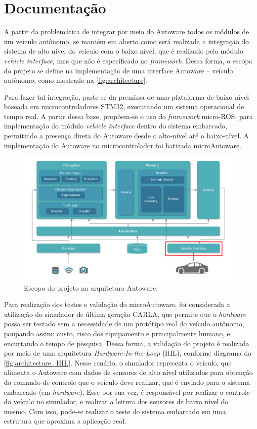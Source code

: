 \clearpage

\section{Documentação}

A partir da problemática de integrar por meio do Autoware todos os módulos de um veículo autônomo, se mantém em aberto como será realizada a integração do sistema de alto nível do veículo com o baixo nível, que é realizado pelo módulo \textit{vehicle interface}, mas que não é especificado no \textit{framework}. Dessa forma, o escopo do projeto se define na implementação de uma interface Autoware -- veículo autônomo, como mostrado na \autoref{fig:architecture}.

Para fazer tal integração, parte-se da premissa de uma plataforma de baixo nível baseada em microcontroladores STM32, executando um sistema operacional de tempo real. A partir dessa base, propõem-se o uso do \textit{framework} micro-ROS\cite{microros_main}, para implementação do módulo \textit{vehicle interface} dentro do sistema embarcado, permitindo a presença direta do Autoware desde o alto-nível até o baixo-nível. A implementação do Autoware no microcontrolador foi batizada microAutoware.

\begin{figure}[H]
	\centering
	\includegraphics[width=0.75\linewidth]{img/architecture.png}
	\caption{Escopo do projeto na arquitetura Autoware.}
	\label{fig:architecture}
\end{figure}

Para realização dos testes e validação do microAutoware, foi considerada a utilização do simulador de última geração CARLA\cite{carla}, que permite que o \textit{hardware} possa ser testado sem a necessidade de um protótipo real do veículo autônomo, poupando assim: custo, risco dos equipamento e principalmente humano, e encurtando o tempo de pesquisa. Dessa forma, a validação do projeto é realizada por meio de uma arquitetura \textit{Hardware-In-the-Loop} (HIL), conforme diagrama da \autoref{fig:architecture_HIL}. Nesse cenário, o simulador representa o veículo, que alimenta o Autoware com dados de sensores de alto nível utilizados para obtenção do comando de controle que o veículo deve realizar, que é enviado para o sistema embarcado (em \textit{hardware}). Esse por sua vez, é responsável por realizar o controle do veículo no simulador, e realizar a leitura dos sensores de baixo nível do mesmo. Com isso, pode-se realizar o teste do sistema embarcado em uma estrutura que aproxima a aplicação real.

